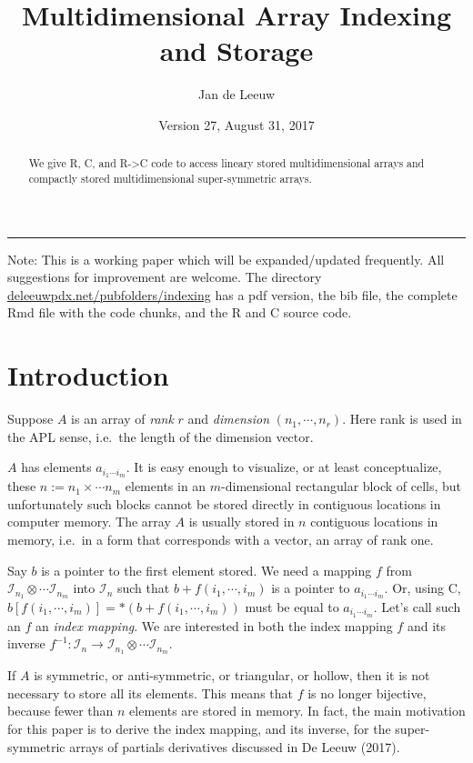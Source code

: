 \documentclass[12pt,]{article}
\title{Multidimensional Array Indexing and Storage}
\author{Jan de Leeuw}
\date{Version 27, August 31, 2017}
\begin{document}
\maketitle
\begin{abstract}
We give R, C, and R-\textgreater{}C code to access lineary stored
multidimensional arrays and compactly stored multidimensional
super-symmetric arrays.
\end{abstract}

{
\setcounter{tocdepth}{3}
\tableofcontents
}
\begin{center}\rule{0.5\linewidth}{\linethickness}\end{center}

Note: This is a working paper which will be expanded/updated frequently.
All suggestions for improvement are welcome. The directory
\href{http://deleeuwpdx.net/pubfolders/indexing}{deleeuwpdx.net/pubfolders/indexing}
has a pdf version, the bib file, the complete Rmd file with the code
chunks, and the R and C source code.

\section{Introduction}\label{introduction}

Suppose \(A\) is an array of \emph{rank} \(r\) and \emph{dimension}
\((n_1,\cdots,n_r)\). Here rank is used in the APL sense, i.e.~the
length of the dimension vector.

\(A\) has elements \(a_{i_1\cdots i_m}\). It is easy enough to
visualize, or at least conceptualize, these \(n:=n_1\times\cdots n_m\)
elements in an \(m\)-dimensional rectangular block of cells, but
unfortunately such blocks cannot be stored directly in contiguous
locations in computer memory. The array \(A\) is usually stored in \(n\)
contiguous locations in memory, i.e.~in a form that corresponds with a
vector, an array of rank one.

Say \(b\) is a pointer to the first element stored. We need a mapping
\(f\) from \(\mathcal{I}_{n_1}\otimes\cdots\mathcal{I}_{n_m}\) into
\(\mathcal{I}_n\) such that \(b+f(i_1,\cdots,i_m)\) is a pointer to
\(a_{i_1\cdots i_m}\). Or, using C,
\(b[f(i_1,\cdots,i_m)]=*(b+f(i_1,\cdots,i_m))\) must be equal to
\(a_{i_1\cdots i_m}\). Let's call such an \(f\) an \emph{index mapping}.
We are interested in both the index mapping \(f\) and its inverse
\(f^{-1}:\mathcal{I}_n\rightarrow\mathcal{I}_{n_1}\otimes\cdots\mathcal{I}_{n_m}\).

If \(A\) is symmetric, or anti-symmetric, or triangular, or hollow, then
it is not necessary to store all its elements. This means that \(f\) is
no longer bijective, because fewer than \(n\) elements are stored in
memory. In fact, the main motivation for this paper is to derive the
index mapping, and its inverse, for the super-symmetric arrays of
partials derivatives discussed in De Leeuw (2017).
\end{document}
